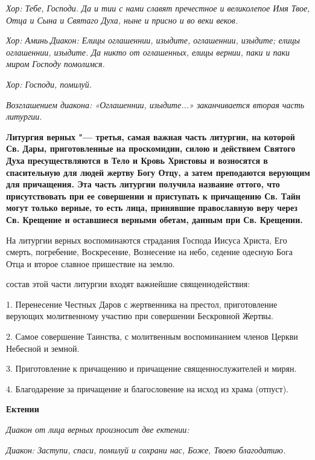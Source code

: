 \itshape Хор:\normalfont{} Тебе, Господи. Да и тии с нами славят пречестное и великолепое Имя Твое, Отца и Сына и Святаго Духа, ныне и присно и во веки веков.


\itshape Хор:\normalfont{} Аминь.\itshape  Диакон:\normalfont{} Елицы оглашеннии, изыдите, оглашеннии, изыдите; елицы оглашеннии, изыдите. Да никто от оглашенных, елицы вернии, паки и паки миром Господу помолимся.


\itshape Хор:\normalfont{} Господи, помилуй.


\itshape Возглашением диакона: «Оглашеннии, изыдите...» заканчивается вторая часть литургии.\normalfont{}\mychapterending

 


\bfseries Литургия верных\normalfont{} "--- третья, самая важная часть литургии, на которой Св. Дары, приготовленные на проскомидии, силою и действием Святого Духа пресуществляются в Тело и Кровь Христовы и возносятся в спасительную для людей жертву Богу Отцу, а затем преподаются верующим для причащения. Эта часть литургии получила название оттого, что присутствовать при ее совершении и приступать к причащению Св. Тайн могут только верные, то есть лица, принявшие православную веру через Св. Крещение и оставшиеся верными обетам, данным при Св. Крещении.



  На литургии верных воспоминаются страдания Господа Иисуса Христа, Его смерть, погребение, Воскресение, Вознесение на небо, седение одесную Бога Отца и второе славное пришествие на землю.


 состав этой части литургии входят важнейшие священнодействия:


  1. Перенесение Честных Даров с жертвенника на престол, приготовление верующих молитвенному участию при совершении Бескровной Жертвы.


  2. Самое совершение Таинства, с молитвенным воспоминанием членов Церкви Небесной и земной. 


  3. Приготовление к причащению и причащение священнослужителей и мирян.


  4. Благодарение за причащение и благословение на исход из храма (отпуст).


\medskip\bfseries Ектении\normalfont{}\nopagebreak


\itshape Диакон от лица верных произносит две ектении:\normalfont{}


 \itshape  Диакон:\normalfont{} Заступи, спаси, помилуй и сохрани нас, Боже, Твоею благодатию.


